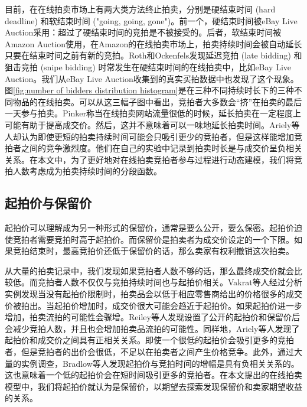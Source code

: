 目前，在在线拍卖市场上有两大类方法终止拍卖，分别是硬结束时间 (hard deadline) 和软结束时间 ("going, going, gone")。前一个，硬结束时间被eBay Live Auction采用：超过了硬结束时间的竞拍是不被接受的。后者，软结束时间被Amazon Auction使用\cite{amazonauction}，在Amazon的在线拍卖市场上，拍卖持续时间会被自动延长只要在结束时间之前有新的竞拍。Roth和Ockenfels\cite{Roth2002Last}发现延迟竞拍 (late bidding) 和狙击竞拍 (snipe bidding) 时常发生在硬结束时间的在线拍卖中，比如eBay Live Auction。我们从eBay Live Auction收集到的真实买拍数据中也发现了这个现象。图\ref{fig:number of bidders distribution histogram}是在三种不同持续时长下的三种不同物品的在线拍卖。可以从这三幅子图中看出，竞拍者大多数会“挤”在拍卖的最后一天参与拍卖。Pinker\cite{Pinker2003Managing}称当在线拍卖网站流量很低的时候，延长拍卖在一定程度上可能有助于提高成交价。然后，这并不意味着可以一味地延长拍卖时间。Ariely等人\cite{Dan2003Buying}却认为即使更短的拍卖持续时间可能会只吸引更少的竞拍者，但是这样能增加竞拍者之间的竞争激烈度。他们在自己的实验中记录到拍卖时长是与成交价呈负相关关系。在本文中，为了更好地对在线拍卖竞拍者参与过程进行动态建模，我们将竞拍人数考虑成为拍卖持续时间的分段函数。

\subsection{起拍价与保留价}

起拍价可以理解成为另一种形式的保留价，通常是要么公开，要么保密。起拍价迫使竞拍者需要竞拍时高于起拍价。而保留价是拍卖者为成交价设定的一个下限。如果竞拍结束时，最高竞拍价还低于保留价的话，那么卖家有权利撤销这次拍卖。

从大量的拍卖记录中，我们发现如果竞拍者人数不够的话，那么最终成交价就会比较低。而竞拍者人数不仅仅与竞拍持续时间也与起拍价相关。Vakrat等人\cite{Pinker2001Using}经过分析实例发现当没有起拍价限制时，拍卖品会以低于相应零售商给出的价格很多的成交价被拍出。当起拍价增加时，成交价很大可能会趋近于起拍价。如果起拍价进一步增加，拍卖流拍的可能性会骤增。Reiley等人\cite{Ockenfels2006Online}发现设置了公开的起拍价和保留价后会减少竞拍人数，并且也会增加拍卖品流拍的可能性。同样地，Ariely等人\cite{Dan2003Buying}发现了起拍价和成交价之间具有正相关关系。即使一个很低的起拍价会吸引更多的竞拍者，但是竞拍者的出价会很低，不足以在拍卖者之间产生价格竞争。此外，通过大量的实例调查，Bradlow等人\cite{Bradlow2007Bayesian}发现起拍价与竞拍时间的增幅是具有负相关关系的。这也意味着一个低的起拍价会在短时间吸引更多的竞拍者。在本文提出的在线拍卖模型中，我们将起拍价就认为是保留价，以期望去探索发现保留价和卖家期望收益的关系。

